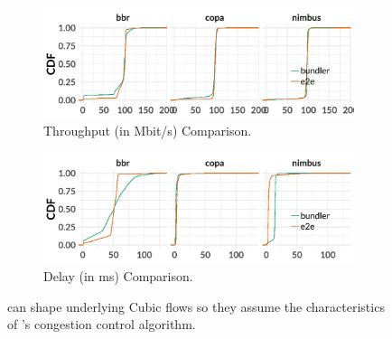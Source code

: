 \begin{figure}
    \centering
    \begin{subfigure}[b]{0.5\textwidth}
\begin{knitrout}
\color{fgcolor}
\includegraphics[width=\maxwidth]{figure/eval:tput-delay:a-1} 

\end{knitrout}
    \caption{Throughput (in Mbit/s) Comparison.}\label{fig:eval:tputdelay:a}
    \end{subfigure}
    \begin{subfigure}[b]{0.5\textwidth}
\begin{knitrout}
\color{fgcolor}
\includegraphics[width=\maxwidth]{figure/eval:tput-delay:b-1} 

\end{knitrout}
    \caption{Delay (in ms) Comparison.}\label{fig:eval:tputdelay:b}
    \end{subfigure}

    \caption{\name can shape underlying Cubic flows so they assume the characteristics of \name's congestion control algorithm.}
    \label{fig:eval:tputdelay}
\end{figure}
